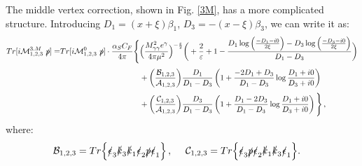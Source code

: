 \documentclass[aps,prd,superscriptaddress,floatfix,showpacs]{revtex4}
\begin{document}
The middle vertex correction, shown in Fig. \ref{3M}, has a more complicated structure. Introducing $D_1= (x+\xi)\beta_1$, $D_3= -(x-\xi)\beta_3$, we can write it as:
\begin{align}
Tr[i\mathcal{M}^{3.M}_{1,2,3}~\slashed{p}]
=&
Tr[i\mathcal{M}^{0}_{1,2,3}~\slashed{p}]\cdot
\frac{\alpha_S C_F}{4\pi}\Bigg\{\Big( \frac{M^2_{\gamma\gamma} e^\gamma}{4\pi\mu^2} \Big)^{-\frac{\varepsilon}{2}}
\bigg{(} 
+\frac{2}{\varepsilon} +1- \frac{D_1\log\Big(\frac{-D_1 -i0}{2\xi}\Big) -  D_3\log\Big(\frac{-D_3 -i0}{2\xi}\Big)}{D_1-D_3}
\bigg{)} 
\nonumber\\
&
\phantom{Tr[i\mathcal{M}^{0}_{1,2,3}~\slashed{p}]\cdot
\frac{\alpha_S C_F}{4\pi}\Bigg\{}
+\bigg(  \frac{\mathcal{B}_{1,2,3}}{\mathcal{A}_{1,2,3}}\bigg)
\frac{D_1}{D_1-D_3}
\left(
1+\frac{-2D_1+D_3}{D_1-D_3}\log\frac{D_1+i0}{D_3+i0}
\right)
\nonumber\\
&
\phantom{Tr[i\mathcal{M}^{0}_{1,2,3}~\slashed{p}]\cdot
\frac{\alpha_S C_F}{4\pi}\Bigg\{}
+\bigg(\frac{\mathcal{C}_{1,2,3}}{\mathcal{A}_{1,2,3}}\bigg)
\frac{D_3}{D_1-D_3}
\left(
1+\frac{D_1-2D_3}{D_1-D_3}\log\frac{D_1+i0}{D_3+i0}
\right)
\Bigg\}\,,
\label{eq:3M}
\end{align}
where:
\begin{align}
    \mathcal{B}_{1,2,3} = Tr\Big{\{} \slashed{\epsilon}_3 \slashed{k}_3 \slashed{k}_1 \slashed{\epsilon}_2\slashed{p} \slashed{\epsilon}_1 \Big{\}}& \nonumber\,,~~~~
    \mathcal{C}_{1,2,3} =Tr\Big{\{} \slashed{\epsilon}_3 \slashed{p}\slashed{\epsilon}_2  \slashed{k}_1 \slashed{k}_3\slashed{\epsilon}_1 \Big{\}}. &
\end{align}
\end{document}
